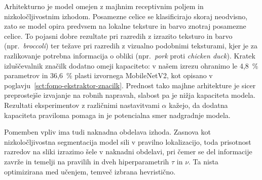 \documentclass[a4paper,twoside,openright,12pt,slovene]{book}
\begin{document}
            Arhitekturno je model omejen z majhnim receptivnim poljem in
            nizkoločljivostnim izhodom. Posamezne celice se klasificirajo
            skoraj neodvisno, zato se model opira predvsem na lokalne teksture
            in barvo znotraj posamezne celice. To pojasni dobre
            rezultate pri razredih z izrazito teksturo in barvo (npr.\
            \emph{broccoli}) ter težave pri razredih z vizualno podobnimi
            teksturami, kjer je za razlikovanje potrebna informacija o obliki
            (npr.\ \emph{pork} proti \emph{chicken duck}). Kratek izluščevalnik
            značilk dodatno omeji kapaciteto: v našem izrezu ohranimo le
            4{,}8~\% parametrov in 36{,}6~\% plasti izvornega MobileNetV2,
            kot opisano v
            poglavju~\ref{sct:fomo-ekstraktor-znacilk}.
            Prednost tako majhne arhitekture je sicer preprostejše izvajanje na
            robnih napravah, slabost pa je nižja kapaciteta modela. Rezultati
            eksperimentov z različnimi nastavitvami $\alpha$ kažejo, da dodatna
            kapaciteta praviloma pomaga in je potencialna smer nadgradnje
            modela.
            
            Pomemben vpliv ima tudi naknadna obdelava izhoda. Zasnova kot
            nizkoločljivostna segmentacija model sili v pravilno lokalizacijo,
            toda prisotnost razredov na sliki izrazimo šele v naknadni
            obdelavi, pri čemer se del informacije zavrže in temelji na
            pravilih in dveh hiperparametrih $\tau$ in $\nu$. Ta nista
            optimizirana med učenjem, temveč izbrana hevristično.
    
\end{document}

